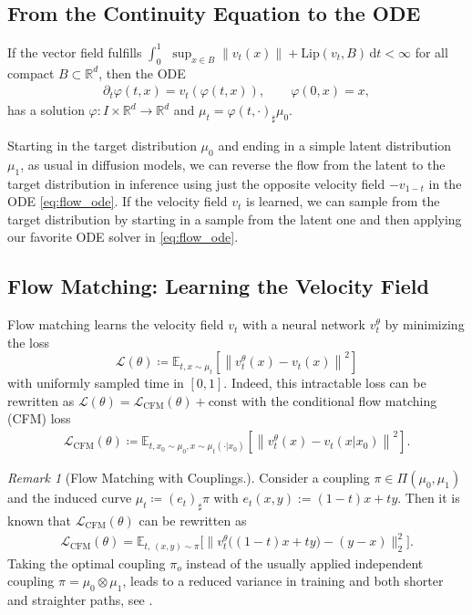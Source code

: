 \documentclass{article}
\newcommand{\R}{\mathbb{R}}
\renewcommand{\d}{\, \mathrm{d}}
\theoremstyle{plain}
\theoremstyle{definition}
\theoremstyle{remark}
\newtheorem{remark}[theorem]{Remark}
\begin{document}
\subsection{From the Continuity Equation to the ODE}
If the vector field fulfills
$
\int_0^1 ~\, \sup_{x \in B} \|v_t(x)\|+\mathrm{Lip}(v_t,B)\d t<\infty 
$
for all compact $B\subset \R^d$, then the ODE
\begin{align}\label{eq:flow_ode} 
\partial_t \varphi(t,x)=v_t(\varphi(t,x)), \qquad \varphi(0,x)=x,
\end{align}
has a solution
$\varphi:I\times\R^d\to \R^d$ 
and 
$\mu_t = \varphi(t,\cdot)_\sharp\mu_0$.

Starting in the target distribution $\mu_0$ and ending in a simple latent distribution $\mu_1$, as usual in diffusion models,
we can reverse the flow from the latent to the target distribution in inference using just the opposite velocity field $-v_{1-t}$ in the ODE \eqref{eq:flow_ode}.
If the velocity field $v_t$ is learned, we can sample from the target distribution by starting in a sample from the latent one and then applying our favorite ODE solver in \eqref{eq:flow_ode}.

\subsection{Flow Matching: Learning the Velocity Field} 
Flow matching learns the velocity field $v_t$ with a neural network $v_t^\theta$ by minimizing the loss
\begin{equation}
        \mathcal{L}(\theta) \coloneqq
        \mathbb{E}_{t,   x \sim \mu_t} \left[ \left\| v_t^\theta(x) - v_t(x) \right\|^2 \right]
\end{equation}
with uniformly sampled time in $[0,1]$.
Indeed,  this intractable loss can be rewritten as
$
\mathcal{L}(\theta) =  \mathcal{L}_{\mathrm{CFM}}(\theta) + \text{const}
$
with the conditional flow matching (CFM) loss 
\begin{align*} %
     \mathcal{L}_{\mathrm{CFM}}(\theta) \!\coloneqq \! \mathbb{E}_{ t ,  x_0 \sim \mu_0,  x \sim \mu_t(\cdot| x_0)} \left[ \left\| v_t^\theta(x) - v_t(x| x_0) \right\|^2 \right].   
\end{align*}  

\begin{remark}[Flow Matching with Couplings.]\label{ot_coup}
Consider a coupling $\pi \in \Pi(\mu_0,\mu_1)$ and the induced curve $\mu_t \coloneqq (e_t)_ \sharp \pi$ with $e_t(x,y):= (1-t)x +ty$.
Then it is known that $\mathcal L_{\mathrm{CFM}}(\theta)$
can be rewritten as
\begin{align} \label{ot_fm_loss}
\mathcal{L}_{\mathrm{CFM}}(\theta) \! = \!\mathbb{E}_{t,\, (x,y) \sim \pi}
 \Big[\big\|v^\theta_t \big( (1-t)x + ty \big) - (y - x)\big\|_2^2\Big].
\end{align} 
Taking the optimal coupling
$\pi_o$ instead of the usually applied
independent coupling
$\pi = \mu_0 \otimes \mu_1$, 
leads to a reduced variance in training and both shorter and straighter paths, see \cite{tong2024improvinggeneralizingflowbasedgenerative,pooladian2023multisampleflowmatchingstraightening}. 
\end{remark}
\end{document}
